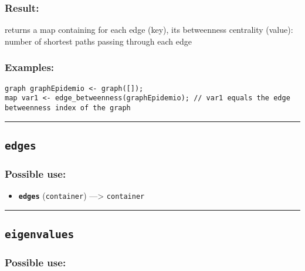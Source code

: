 \documentclass[]{book}
\providecommand{\tightlist}{%
  \setlength{\itemsep}{0pt}\setlength{\parskip}{0pt}}
\theoremstyle{definition}
\theoremstyle{definition}
\theoremstyle{definition}
\theoremstyle{remark}
\begin{document}
\subsubsection{Result:}\label{result-141}

returns a map containing for each edge (key), its betweenness centrality
(value): number of shortest paths passing through each edge

\subsubsection{Examples:}\label{examples-110}

\begin{verbatim}
graph graphEpidemio <- graph([]);  
map var1 <- edge_betweenness(graphEpidemio); // var1 equals the edge betweenness index of the graph
\end{verbatim}

\begin{center}\rule{0.5\linewidth}{\linethickness}\end{center}

\subsection{\texorpdfstring{\texttt{edges}}{edges}}\label{edges}

\subsubsection{Possible use:}\label{possible-use-147}

\begin{itemize}
\tightlist
\item
  \textbf{\texttt{edges}} (\texttt{container}) ---\textgreater{}
  \texttt{container}
\end{itemize}

\begin{center}\rule{0.5\linewidth}{\linethickness}\end{center}

\subsection{\texorpdfstring{\texttt{eigenvalues}}{eigenvalues}}\label{eigenvalues}

\subsubsection{Possible use:}\label{possible-use-148}
\end{document}

